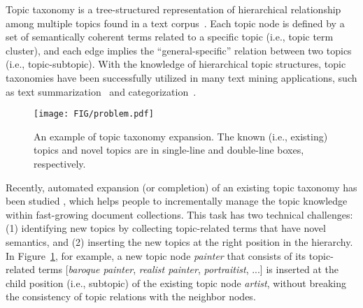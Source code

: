 Topic taxonomy is a tree-structured representation of hierarchical relationship among multiple topics found in a text corpus~\cite{zhang2018taxogen, shang2020nettaxo, meng2020hierarchical}. 
Each topic node is defined by a set of semantically coherent terms related to a specific topic (i.e., topic term cluster), and each edge implies the ``general-specific'' relation between two topics (i.e., topic-subtopic).
With the knowledge of hierarchical topic structures, topic taxonomies have been successfully utilized in many text mining applications, such as text summarization~\cite{petinot2011hierarchical, bairi2015summarization} and categorization~\cite{meng2019weakly, shen2021taxoclass}.

\begin{figure}[t]
    \centering
    \texttt{[image: FIG/problem.pdf]}
    \caption{An example of topic taxonomy expansion. The known (i.e., existing) topics and novel topics are in single-line and double-line boxes, respectively.}
    \label{fig:problem}
\end{figure}

Recently, automated expansion (or completion) of an existing topic taxonomy has been studied \cite{huang2020corel, lee2022taxocom}, which helps people to incrementally manage the topic knowledge within fast-growing document collections.
This task has two technical challenges:
(1) identifying new topics by collecting topic-related terms that have novel semantics, and (2) inserting the new topics at the right position in the hierarchy.
In Figure~\ref{fig:problem}, for example, a new topic node \textit{painter} that consists of its topic-related terms [\textit{baroque painter}, \textit{realist painter}, \textit{portraitist}, ...] is inserted at the child position (i.e., subtopic) of the existing topic node \textit{artist}, without breaking the consistency of topic relations with the neighbor nodes.

